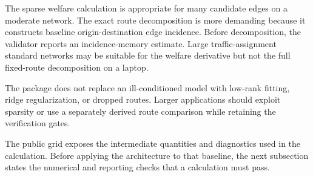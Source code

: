 The sparse welfare calculation is appropriate for many candidate edges on a
moderate network. The exact route decomposition is more demanding because it
constructs baseline origin-destination edge incidence. Before decomposition,
the validator reports an incidence-memory estimate. Large traffic-assignment
standard networks may be suitable for the welfare derivative but not the full
fixed-route decomposition on a laptop.

The package does not replace an ill-conditioned model with low-rank fitting,
ridge regularization, or dropped routes. Larger applications should exploit
sparsity or use a separately derived route comparison while retaining the
verification gates.

The public grid exposes the intermediate quantities and diagnostics used in the
calculation. Before applying the architecture to that baseline, the next
subsection states the numerical and reporting checks that a calculation must
pass.
